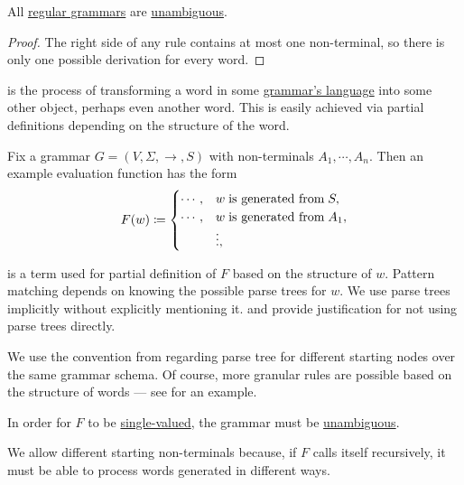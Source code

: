 \begin{proposition}\label{thm:regular_grammars_are_unambiguous}
  All \hyperref[def:chomsky_hierarchy/regular]{regular grammars} are \hyperref[def:grammar_ambiguity]{unambiguous}.
\end{proposition}
\begin{proof}
  The right side of any rule contains at most one non-terminal, so there is only one possible derivation for every word.
\end{proof}

\begin{remark}\label{rem:evaluation}
   is the process of transforming a word in some \hyperref[def:formal_grammar/language]{grammar's language} into some other object, perhaps even another word. This is easily achieved via partial definitions depending on the structure of the word.

  Fix a grammar \( G = (V, \Sigma, \to, S) \) with non-terminals \( A_1, \cdots, A_n \). Then an example evaluation function has the form
  \begin{equation*}
    F(w) \coloneqq \begin{cases}
      \cdots, &w \T{is generated from} S, \\
      \cdots, &w \T{is generated from} A_1, \\
              &\vdots,
    \end{cases}
  \end{equation*}

   is a term used for partial definition of \( F \) based on the structure of \( w \). Pattern matching depends on knowing the possible parse trees for \( w \). We use parse trees implicitly without explicitly mentioning it.  and  provide justification for not using parse trees directly.

  We use the convention from  regarding parse tree for different starting nodes over the same grammar schema. Of course, more granular rules are possible based on the structure of words --- see  for an example.
\end{remark}
\begin{comments}
  \item In order for \( F \) to be \hyperref[def:function]{single-valued}, the grammar must be \hyperref[def:grammar_ambiguity]{unambiguous}.
  \item We allow different starting non-terminals because, if \( F \) calls itself recursively, it must be able to process words generated in different ways.
\end{comments}

